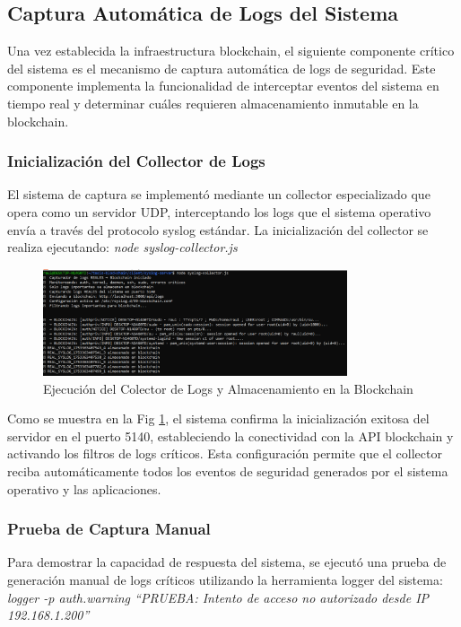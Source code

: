 \subsection{Captura Automática de Logs del Sistema}
Una vez establecida la infraestructura blockchain, el siguiente componente crítico del sistema es el mecanismo de captura automática de logs de seguridad. Este componente implementa la funcionalidad de interceptar eventos del sistema en tiempo real y determinar cuáles requieren almacenamiento inmutable en la blockchain.
\subsubsection{Inicialización del Collector de Logs}
El sistema de captura se implementó mediante un collector especializado que opera como un servidor UDP, interceptando los logs que el sistema operativo envía a través del protocolo syslog estándar. La inicialización del collector se realiza ejecutando: \textit{node syslog-collector.js}
\begin{figure}[H]
    \centering
    \includegraphics[width=0.8\textwidth]{figuras/collector_inicio.png}
    \caption{Ejecución del Colector de Logs y Almacenamiento en la Blockchain}
    \label{fig:collector_inicio}
\end{figure}

Como se muestra en la Fig \ref{fig:collector_inicio}, el sistema confirma la inicialización exitosa del servidor en el puerto 5140, estableciendo la conectividad con la API blockchain y activando los filtros de logs críticos. Esta configuración permite que el collector reciba automáticamente todos los eventos de seguridad generados por el sistema operativo y las aplicaciones.

\subsubsection{Prueba de Captura Manual}
Para demostrar la capacidad de respuesta del sistema, se ejecutó una prueba de generación manual de logs críticos utilizando la herramienta logger del sistema: \textit{logger -p auth.warning 
“PRUEBA: Intento de acceso no autorizado desde IP 192.168.1.200”}


